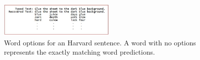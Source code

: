 \documentclass[11pt,conference]{IEEEtran}
\begin{document}
\begin{table}[h]
\centering
{%
{}
}
\caption{Percentage of words recovered with at most the given number of errors in predictions}
\label{tab:harvard-labels}
\end{table}

\begin{figure}
\centering
\includegraphics[width=0.5\textwidth]{img/words-options}
\caption{Word options for an Harvard sentence. A word with no options represents the
exactly matching word predictions.}
\label{fig:words-options}
\end{figure}


%
%
\end{document}

